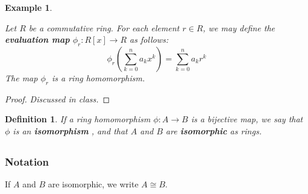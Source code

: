 \documentclass[a4paper,12pt]{report}
\newcounter{statement}
\numberwithin{statement}{chapter}
\newtheorem{defn}[statement]{Definition}
\newtheorem{eg}[statement]{\bf Example}
\numberwithin{equation}{chapter}
\numberwithin{section}{chapter}
\numberwithin{subsection}{section}
\begin{document}
\begin{eg}
\label{eg:evalhomom}



Let $R$ be a commutative ring.  For each element $r \in R$,
we may define the  {\bf evaluation map} 
$\phi_r : R[x] \rightarrow R$ as follows:
\[
\phi_r\left(\sum_{k = 0}^n a_k x^k\right) = \sum_{k = 0}^n a_k r^k
\]
The map $\phi_r$ is a ring homomorphism.
\end{eg}
\begin{proof}
 {\it Discussed in class.} 
\end{proof}




\begin{defn}
If a ring homomorphism $\phi: A \rightarrow B$ is a bijective map, we say that $\phi$ is an  {\bf isomorphism} ,
and that $A$ and $B$ are  {\bf isomorphic}  as rings.
\end{defn}


\subsection{}

              
              
            
\subsubsection{Notation}


If $A$ and $B$ are isomorphic, we write $A \cong B$.
\end{document}
